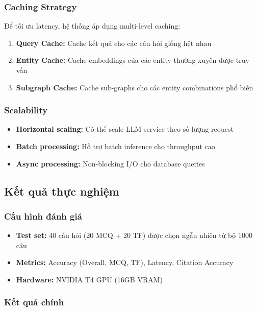 \subsubsection{Caching Strategy}

Để tối ưu latency, hệ thống áp dụng multi-level caching:

\begin{enumerate}
    \item \textbf{Query Cache:} Cache kết quả cho các câu hỏi giống hệt nhau
    \item \textbf{Entity Cache:} Cache embeddings của các entity thường xuyên được truy vấn
    \item \textbf{Subgraph Cache:} Cache sub-graphs cho các entity combinations phổ biến
\end{enumerate}

\subsubsection{Scalability}

\begin{itemize}
    \item \textbf{Horizontal scaling:} Có thể scale LLM service theo số lượng request
    \item \textbf{Batch processing:} Hỗ trợ batch inference cho throughput cao
    \item \textbf{Async processing:} Non-blocking I/O cho database queries
\end{itemize}

\subsection{Kết quả thực nghiệm}

\subsubsection{Cấu hình đánh giá}

\begin{itemize}
    \item \textbf{Test set:} 40 câu hỏi (20 MCQ + 20 TF) được chọn ngẫu nhiên từ bộ 1000 câu
    \item \textbf{Metrics:} Accuracy (Overall, MCQ, TF), Latency, Citation Accuracy
    \item \textbf{Hardware:} NVIDIA T4 GPU (16GB VRAM)
\end{itemize}

\subsubsection{Kết quả chính}

